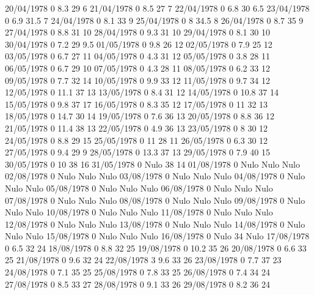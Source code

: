 20/04/1978  0      8.3    29     6 
21/04/1978  0      8.5    27     7 
22/04/1978  0      6.8    30     6.5 
23/04/1978  0      6.9    31.5   7 
24/04/1978  0      8.1    33     9 
25/04/1978  0      8      34.5   8 
26/04/1978  0      8.7    35     9 
27/04/1978  0      8.8    31     10 
28/04/1978  0      9.3    31     10 
29/04/1978  0      8.1    30     10 
30/04/1978  0      7.2    29     9.5 
01/05/1978  0      9.8    26     12 
02/05/1978  0      7.9    25     12 
03/05/1978  0      6.7    27     11 
04/05/1978  0      4.3    31     12 
05/05/1978  0      3.8    28     11 
06/05/1978  0      6.7    29     10 
07/05/1978  0      4.3    28     11 
08/05/1978  0      6.2    33     12 
09/05/1978  0      7.7    32     14 
10/05/1978  0      9.9    33     12 
11/05/1978  0      9.7    34     12 
12/05/1978  0      11.1   37     13 
13/05/1978  0      8.4    31     12 
14/05/1978  0      10.8   37     14 
15/05/1978  0      9.8    37     17 
16/05/1978  0      8.3    35     12 
17/05/1978  0      11     32     13 
18/05/1978  0      14.7   30     14 
19/05/1978  0      7.6    36     13 
20/05/1978  0      8.8    36     12 
21/05/1978  0      11.4   38     13 
22/05/1978  0      4.9    36     13 
23/05/1978  0      8      30     12 
24/05/1978  0      8.8    29     15 
25/05/1978  0      11     28     11 
26/05/1978  0      6.3    30     12 
27/05/1978  0      9.4    29     9 
28/05/1978  0      13.3   37     13 
29/05/1978  0      7.9    40     15 
30/05/1978  0      10     38     16 
31/05/1978  0     Nulo    38     14 
01/08/1978  0     Nulo   Nulo   Nulo
02/08/1978  0     Nulo   Nulo   Nulo
03/08/1978  0     Nulo   Nulo   Nulo
04/08/1978  0     Nulo   Nulo   Nulo
05/08/1978  0     Nulo   Nulo   Nulo
06/08/1978  0     Nulo   Nulo   Nulo
07/08/1978  0     Nulo   Nulo   Nulo
08/08/1978  0     Nulo   Nulo   Nulo
09/08/1978  0     Nulo   Nulo   Nulo
10/08/1978  0     Nulo   Nulo   Nulo
11/08/1978  0     Nulo   Nulo   Nulo
12/08/1978  0     Nulo   Nulo   Nulo
13/08/1978  0     Nulo   Nulo   Nulo
14/08/1978  0     Nulo   Nulo   Nulo
15/08/1978  0     Nulo   Nulo   Nulo
16/08/1978  0     Nulo    34    Nulo
17/08/1978  0      6.5    32     24 
18/08/1978  0      8.8    32     25 
19/08/1978  0      10.2   35     26 
20/08/1978  0      6.6    33     25 
21/08/1978  0      9.6    32     24 
22/08/1978  3      9.6    33     26 
23/08/1978  0      7.7    37     23 
24/08/1978  0      7.1    35     25 
25/08/1978  0      7.8    33     25 
26/08/1978  0      7.4    34     24 
27/08/1978  0      8.5    33     27 
28/08/1978  0      9.1    33     26 
29/08/1978  0      8.2    36     24 
